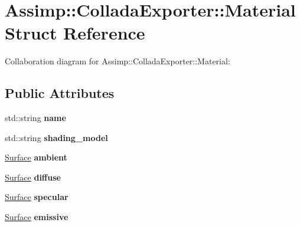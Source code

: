 \hypertarget{struct_assimp_1_1_collada_exporter_1_1_material}{\section{Assimp\+:\+:Collada\+Exporter\+:\+:Material Struct Reference}
\label{struct_assimp_1_1_collada_exporter_1_1_material}
}


Collaboration diagram for Assimp\+:\+:Collada\+Exporter\+:\+:Material\+:
\subsection*{Public Attributes}
\begin{DoxyCompactItemize}
\item 
\hypertarget{struct_assimp_1_1_collada_exporter_1_1_material_aa7476a712afb9800700f080563be67e1}{std\+::string {\bfseries name}}\label{struct_assimp_1_1_collada_exporter_1_1_material_aa7476a712afb9800700f080563be67e1}

\item 
\hypertarget{struct_assimp_1_1_collada_exporter_1_1_material_a145b774f71945be2513f87dbaaa08565}{std\+::string {\bfseries shading\+\_\+model}}\label{struct_assimp_1_1_collada_exporter_1_1_material_a145b774f71945be2513f87dbaaa08565}

\item 
\hypertarget{struct_assimp_1_1_collada_exporter_1_1_material_a93047f7f470b0a6cbde300dfe676e91e}{\hyperlink{struct_assimp_1_1_collada_exporter_1_1_surface}{Surface} {\bfseries ambient}}\label{struct_assimp_1_1_collada_exporter_1_1_material_a93047f7f470b0a6cbde300dfe676e91e}

\item 
\hypertarget{struct_assimp_1_1_collada_exporter_1_1_material_a4aedb8abcbbe61cedafe5e2518df5ae3}{\hyperlink{struct_assimp_1_1_collada_exporter_1_1_surface}{Surface} {\bfseries diffuse}}\label{struct_assimp_1_1_collada_exporter_1_1_material_a4aedb8abcbbe61cedafe5e2518df5ae3}

\item 
\hypertarget{struct_assimp_1_1_collada_exporter_1_1_material_acdb711488b37446f9ba2a53ed3649ab0}{\hyperlink{struct_assimp_1_1_collada_exporter_1_1_surface}{Surface} {\bfseries specular}}\label{struct_assimp_1_1_collada_exporter_1_1_material_acdb711488b37446f9ba2a53ed3649ab0}

\item 
\hypertarget{struct_assimp_1_1_collada_exporter_1_1_material_ab10e20b344f62eb6a09d6a021b4d6a74}{\hyperlink{struct_assimp_1_1_collada_exporter_1_1_surface}{Surface} {\bfseries emissive}}\label{struct_assimp_1_1_collada_exporter_1_1_material_ab10e20b344f62eb6a09d6a021b4d6a74}


\end{DoxyCompactItemize}
